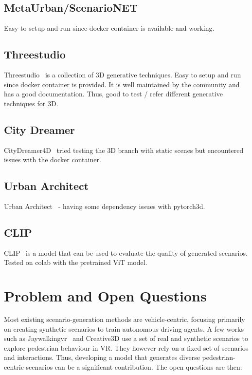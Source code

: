\documentclass{article}
\begin{document}
\subsection{MetaUrban/ScenarioNET}

Easy to setup and run since docker container is available and working.

\subsection{Threestudio}

Threestudio~\cite{liu2023threestudio} is a collection of 3D generative techniques. Easy to setup and run since docker container is provided. It is well maintained by the community and has a good documentation. Thus, good to test / refer different generative techniques for 3D.

\subsection{City Dreamer}

CityDreamer4D~\cite{xie2025citydreamer4d} tried testing the 3D branch with static scenes but encountered issues with the docker container.

\subsection{Urban Architect}

Urban Architect~\cite{lu2024urban} - having some dependency issues with pytorch3d.

\subsection{CLIP}

CLIP~\cite{radford2021learning} is a model that can be used to evaluate the quality of generated scenarios. Tested on colab with the pretrained ViT model.

\section{Problem and Open Questions}

Most existing scenario-generation methods are vehicle-centric, focusing primarily on creating synthetic scenarios to train autonomous driving agents. A few works such as Jaywalkingvr~\cite{mukoya2024jaywalkervr} and Creative3D\cite{wu2023exploring} use a set of real and synthetic scenarios to explore pedestrian behaviour in VR. They however rely on a fixed set of scenarios and interactions. Thus, developing a model that generates diverse pedestrian-centric scenarios can be a significant contribution. The  open questions are then:
\end{document}

